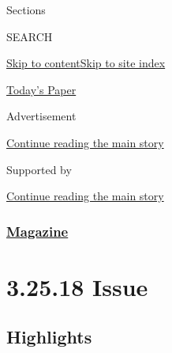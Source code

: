 Sections

SEARCH

\protect\hyperlink{site-content}{Skip to
content}\protect\hyperlink{site-index}{Skip to site index}

\href{https://myaccount.nytimes3xbfgragh.onion/auth/login?response_type=cookie\&client_id=vi}{}

\href{https://www.nytimes3xbfgragh.onion/section/todayspaper}{Today's
Paper}

Advertisement

\protect\hyperlink{after-top}{Continue reading the main story}

Supported by

\protect\hyperlink{after-sponsor}{Continue reading the main story}

\hypertarget{magazine}{%
\subsubsection{\texorpdfstring{\href{/section/magazine}{Magazine}}{Magazine}}\label{magazine}}

\hypertarget{32518-issue}{%
\section{3.25.18 Issue}\label{32518-issue}}

\hypertarget{highlights}{%
\subsection{Highlights}\label{highlights}}

